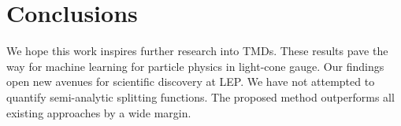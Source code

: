 \section{Conclusions}\label{sec:conclusions}

We hope this work inspires further research into TMDs. These results
pave the way for machine learning for particle physics in light-cone
gauge. Our findings open new avenues for scientific discovery at LEP. We
have not attempted to quantify semi-analytic splitting functions. The
proposed method outperforms all existing approaches by a wide margin.

